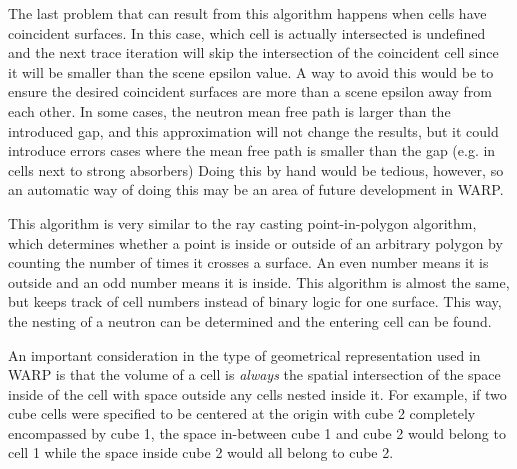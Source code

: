 The last problem that can result from this algorithm happens when cells have coincident surfaces.  In this case, which cell is actually intersected is undefined and the next trace iteration will skip the intersection of the coincident cell since it will be smaller than the scene epsilon value.  A way to avoid this would be to ensure the desired coincident surfaces are more than a scene epsilon away from each other.  In some cases, the neutron mean free path is larger than the introduced gap, and this approximation will not change the results, but it could introduce errors cases where the mean free path is smaller than the gap (e.g. in cells next to strong absorbers) %
 Doing this by hand would be tedious, however, so an automatic way of doing this may be an area of future development in WARP.

This algorithm is very similar to the ray casting point-in-polygon algorithm, which determines whether a point is inside or outside of an arbitrary polygon by counting the number of times it crosses a surface.  An even number means it is outside and an odd number means it is inside.  This algorithm is almost the same, but keeps track of cell numbers instead of binary logic for one surface.  This way, the nesting of a neutron can be determined and the entering cell can be found.  


An important consideration in the type of geometrical representation used in WARP is that the volume of a cell is \emph{always} the spatial intersection of the space inside of the cell with space outside any cells nested inside it.  For example, if two cube cells were specified to be centered at the origin with cube 2 completely encompassed by cube 1, the space in-between cube 1 and cube 2 would belong to cell 1 while the space inside cube 2 would all belong to cube 2.

